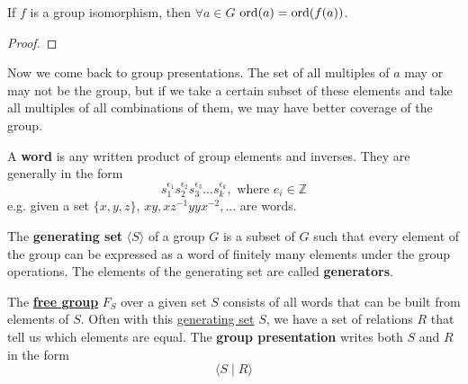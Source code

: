   \begin{theorem}
    \label{thm:preservation-of-order-in-a-group-homomorphism}
    If $f$ is a group isomorphism, then $\forall a \in G$ $\operatorname{ord}(a) = \operatorname{ord}(f(a))$. 
  \end{theorem}
  \begin{proof}
    
  \end{proof}

  Now we come back to group presentations. The set of all multiples of $a$ may or may not be the group, but if we take a certain subset of these elements and take all multiples of all combinations of them, we may have better coverage of the group. 

  \begin{definition}[Word]
    \label{def:word}
    A \textbf{word} is any written product of group elements and inverses. They are generally in the form
    \begin{equation}
      s_{1}^{\epsilon_{1}} s_{2}^{\epsilon_{2}} s_{3}^{\epsilon_{3}}... s_{k}^{\epsilon_{k}}, \text{ where } e_i \in \mathbb{Z}
    \end{equation} 
    e.g. given a set $\{x,y,z\}$, $x y, x z^{-1} y y x^{-2},...$ are words. 
  \end{definition}

  \begin{definition}
    \label{def:generating-set}
    The \textbf{generating set} $\langle S \rangle$ of a group $G$ is a subset of $G$ such that every element of the group can be expressed as a word of finitely many elements under the group operations. The elements of the generating set are called \textbf{generators}. 
  \end{definition}

  \begin{definition}
    \label{def:group-presentations}
 
    The \textbf{\hyperref[st-def:free-group]{free group}} $F_{S}$ over a given set $S$ consists of all words that can be built from elements of $S$. Often with this \hyperref[def:generating-set]{generating set} $S$, we have a set of relations $R$ that tell us which elements are equal. The \textbf{group presentation} writes both $S$ and $R$ in the form 
    \begin{equation}
      \langle S \mid R \rangle
    \end{equation}
  \end{definition}

